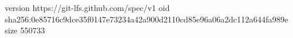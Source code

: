 version https://git-lfs.github.com/spec/v1
oid sha256:0e85716c9dce35f0147e73234a42a900d2110cd85e96a06a2dc112a644fa989e
size 550733
